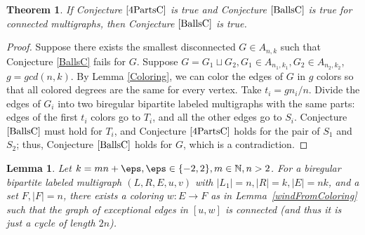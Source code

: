 \documentclass[12pt]{article}
\newtheorem{theorem}{Theorem}
\newtheorem{lemma}{Lemma}[section]
\theoremstyle{definition}
\theoremstyle{plain}
\begin{document}
\begin {theorem}
If Conjecture $\ref{4PartsC}$ is true and Conjecture $\ref{BallsC}$ is true for connected multigraphs, then Conjecture $\ref{BallsC}$ is true.
\end {theorem}

\begin {proof}
Suppose there exists the smallest disconnected $G \in A_{n,k}$ such that Conjecture \ref{BallsC} fails for $G$. Suppose $G = G_1 \sqcup G_2, G_1 \in A_{n_1,k_1}, G_2 \in A_{n_2,k_2}$, $g=gcd(n,k)$. By Lemma \ref {Coloring}, we can color the edges of $G$ in $g$ colors so that all colored degrees are the same for every vertex. Take $t_i = g n_i/n$. Divide the edges of $G_i$ into two biregular bipartite labeled multigraphs with the same parts: edges of the first $t_i$ colors go to $T_i$, and all the other edges go to $S_i$. Conjecture $\ref{BallsC}$ must hold for $T_i$, and Conjecture $\ref{4PartsC}$ holds for the pair of $S_1$ and $S_2$; thus, Conjecture $\ref{BallsC}$ holds for $G$, which is a contradiction.
\end {proof}

\begin{lemma} \label{makeHamiltonian}
Let $k= mn+\eps, \eps \in \{ -2, 2\}, m \in \mathbb{N}, 
n>2$. For a biregular bipartite labeled multigraph $(L,R,E,u,v)$ with $|L_1|=n,|R|=k,|E|=nk$, and a set $F, |F|=n$, there exists a coloring $w : E \rightarrow F$ as in Lemma~\ref{windFromColoring} such that the graph of exceptional edges in $[u,w]$ is connected (and thus it is just a cycle of length $2n$).
\end{lemma}
\end{document}
